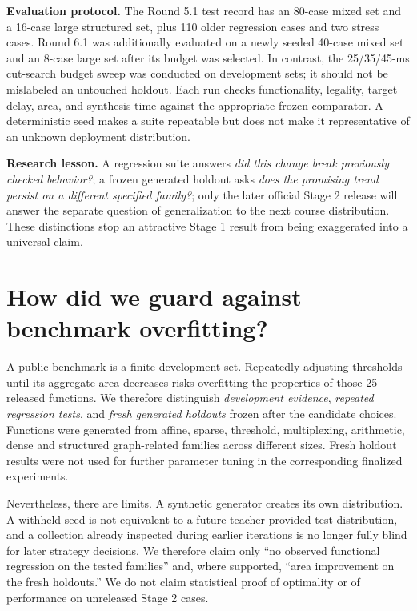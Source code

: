 \textbf{Evaluation protocol.} The Round 5.1 test record has an 80-case mixed set and a 16-case large structured set, plus 110 older regression cases and two stress cases. Round 6.1 was additionally evaluated on a newly seeded 40-case mixed set and an 8-case large set after its budget was selected. In contrast, the 25/35/45-ms cut-search budget sweep was conducted on development sets; it should not be mislabeled an untouched holdout. Each run checks functionality, legality, target delay, area, and synthesis time against the appropriate frozen comparator. A deterministic seed makes a suite repeatable but does not make it representative of an unknown deployment distribution.

\textbf{Research lesson.} A regression suite answers \emph{did this change break previously checked behavior?}; a frozen generated holdout asks \emph{does the promising trend persist on a different specified family?}; only the later official Stage 2 release will answer the separate question of generalization to the next course distribution. These distinctions stop an attractive Stage 1 result from being exaggerated into a universal claim.

\section{How did we guard against benchmark overfitting?}
A public benchmark is a finite development set. Repeatedly adjusting thresholds until its aggregate area decreases risks overfitting the properties of those 25 released functions. We therefore distinguish \emph{development evidence}, \emph{repeated regression tests}, and \emph{fresh generated holdouts} frozen after the candidate choices. Functions were generated from affine, sparse, threshold, multiplexing, arithmetic, dense and structured graph-related families across different sizes. Fresh holdout results were not used for further parameter tuning in the corresponding finalized experiments.

Nevertheless, there are limits. A synthetic generator creates its own distribution. A withheld seed is not equivalent to a future teacher-provided test distribution, and a collection already inspected during earlier iterations is no longer fully blind for later strategy decisions. We therefore claim only ``no observed functional regression on the tested families'' and, where supported, ``area improvement on the fresh holdouts.'' We do not claim statistical proof of optimality or of performance on unreleased Stage 2 cases.


